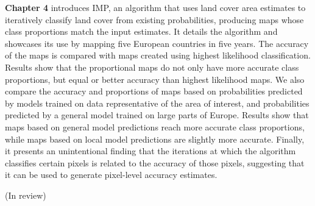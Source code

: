 
\textbf{Chapter 4} introduces IMP, an algorithm that uses land cover area estimates to iteratively classify land cover from existing probabilities, producing maps whose class proportions match the input estimates. It details the algorithm and showcases its use by mapping five European countries in five years. The accuracy of the maps is compared with maps created using highest likelihood classification. Results show that the proportional maps do not only have more accurate class proportions, but equal or better accuracy than highest likelihood maps. We also compare the accuracy and proportions of maps based on probabilities predicted by models trained on data representative of the area of interest, and probabilities predicted by a general model trained on large parts of Europe. Results show that maps based on general model predictions reach more accurate class proportions, while maps based on local model predictions are slightly more accurate. Finally, it presents an unintentional finding that the iterations at which the algorithm classifies certain pixels is related to the accuracy of those pixels, suggesting that it can be used to generate pixel-level accuracy estimates.

(In review)